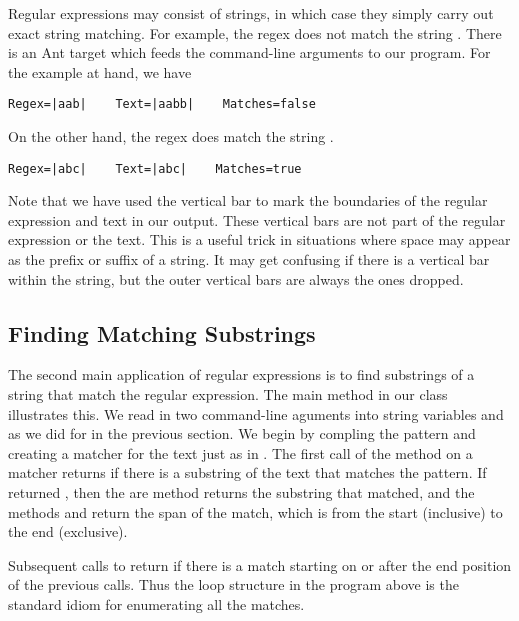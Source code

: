 Regular expressions may consist of strings, in which case they
simply carry out exact string matching.  For example, the regex
 does not match the string .  
There is an Ant target  which feeds the command-line
arguments to our program.  For the example at hand, we have
%
\begin{verbatim}
Regex=|aab|    Text=|aabb|    Matches=false
\end{verbatim}
%
On the other hand, the regex  does match
the string .
%
\begin{verbatim}
Regex=|abc|    Text=|abc|    Matches=true
\end{verbatim}
%
Note that we have used the vertical bar to mark the boundaries of the
regular expression and text in our output.  These vertical bars are
not part of the regular expression or the text.  This is a useful
trick in situations where space may appear as the prefix or suffix of
a string.  It may get confusing if there is a vertical bar within the
string, but the outer vertical bars are always the ones dropped.

\subsection{Finding Matching Substrings}\label{section:regex-find}

The second main application of regular expressions is to find
substrings of a string that match the regular expression.  The main
method in our class  illustrates this.  We read in two
command-line aguments into string variables  and 
as we did for  in the previous section.  We begin
by compling the pattern and creating a matcher for the text just
as in .
%
%
The first call of the  method on a matcher returns
 if there is a substring of the text that matches the
pattern.  If  returned , then the are method
 returns the substring that matched, and the methods
 and  return the span of the match, which is
from the start (inclusive) to the end (exclusive).

Subsequent calls to  return  if there is a
match starting on or after the end position of the previous calls.
Thus the loop structure in the program above is the standard idiom
for enumerating all the matches.  


